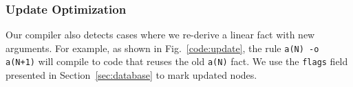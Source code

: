 \subsubsection{Update Optimization}

Our compiler also detects cases where we re-derive a linear fact with new arguments.
For example, as shown in Fig.~\ref{code:update}, the rule \texttt{a(N) -o a(N+1)}
will compile to code that reuses the old \texttt{a(N)} fact.
We use the \texttt{flags} field presented in Section~\ref{sec:database} to mark updated nodes.

